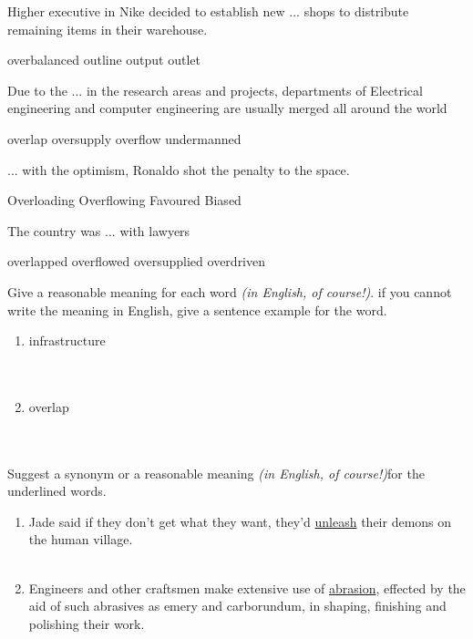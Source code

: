 \documentclass{exam}
\begin{document}
\begin{questions}
\question Higher executive in Nike decided to establish new ... shops to distribute remaining items in their warehouse.\\
\begin{oneparchoices}
\choice overbalanced
\choice outline
\choice output
\correctchoice outlet
\end{oneparchoices}

\question Due to the ... in the research areas and projects, departments of Electrical engineering and computer engineering are usually merged all around the world
\\
\begin{oneparchoices}
\correctchoice overlap
\choice oversupply
\choice overflow
\choice undermanned
\end{oneparchoices}

\question ... with the optimism, Ronaldo shot the penalty to the  space.\\
\begin{oneparchoices}
\choice Overloading
\correctchoice Overflowing
\choice Favoured
\choice Biased
\end{oneparchoices}
\question The country was ... with lawyers\\
\begin{oneparchoices} 
\choice overlapped
\choice overflowed
\correctchoice oversupplied 
\choice overdriven
\end{oneparchoices}



\question Give a reasonable meaning for each word \emph{(in English, of course!)}. if you cannot write the meaning in English, give a sentence example for the word.\\
\begin{enumerate}
	\item infrastructure\\ \\\\
	\item overlap \\ \\\\
\end{enumerate}
\question Suggest a synonym or a reasonable meaning \emph{(in English, of course!)}for the underlined words.\\
\begin{enumerate}
	\item Jade said if they don't get what they want, they'd \underline{unleash} their demons on the human village.\\ \\
	\item Engineers and other craftsmen make extensive use of \underline{abrasion}, effected by the aid of such abrasives as emery and carborundum, in shaping, finishing and polishing their work.\\ \\
\end{enumerate}

\end{questions}
\end{document}
